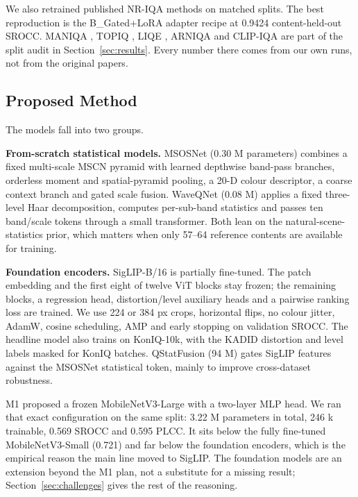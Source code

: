\documentclass[11pt]{article}
\begin{document}
We also retrained published NR-IQA methods on matched splits. The best reproduction is
the B\_Gated+LoRA adapter recipe at 0.9424 content-held-out SROCC. MANIQA
\citep{yang2022maniqa}, TOPIQ \citep{chen2024topiq}, LIQE \citep{zhang2023liqe}, ARNIQA
\citep{agnolucci2024arniqa} and CLIP-IQA \citep{wang2023clipiqa} are part of the split
audit in Section~\ref{sec:results}. Every number there comes from our own runs, not from
the original papers.

\subsection{Proposed Method}
\label{sec:method}

The models fall into two groups.

\textbf{From-scratch statistical models.} MSOSNet (0.30 M parameters) combines a fixed
multi-scale MSCN pyramid with learned depthwise band-pass branches, orderless moment and
spatial-pyramid pooling, a 20-D colour descriptor, a coarse context branch and gated scale
fusion. WaveQNet (0.08 M) applies a fixed three-level Haar decomposition, computes
per-sub-band statistics and passes ten band/scale tokens through a small transformer. Both
lean on the natural-scene-statistics prior, which matters when only 57--64 reference
contents are available for training.

\textbf{Foundation encoders.} SigLIP-B/16 \citep{zhai2023siglip} is partially fine-tuned.
The patch embedding and the first eight of twelve ViT blocks stay frozen; the remaining
blocks, a regression head, distortion/level auxiliary heads and a pairwise ranking loss
are trained. We use 224 or 384 px crops, horizontal flips, no colour jitter, AdamW, cosine
scheduling, AMP and early stopping on validation SROCC. The headline model also trains on
KonIQ-10k, with the KADID distortion and level labels masked for KonIQ batches.
QStatFusion (94 M) gates SigLIP features against the MSOSNet statistical token, mainly to
improve cross-dataset robustness.

M1 proposed a frozen MobileNetV3-Large with a two-layer MLP head. We ran that exact
configuration on the same split: 3.22 M parameters in total, 246 k trainable, 0.569 SROCC
and 0.595 PLCC. It sits below the fully fine-tuned MobileNetV3-Small (0.721) and far below
the foundation encoders, which is the empirical reason the main line moved to SigLIP. The
foundation models are an extension beyond the M1 plan, not a substitute for a missing
result; Section~\ref{sec:challenges} gives the rest of the reasoning.
\end{document}
